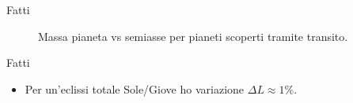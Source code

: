 \begin{frame}{Fatti}
\begin{figure}[!ht]
\centering
\caption{Massa pianeta vs semiasse per pianeti scoperti tramite transito.}
\end{figure}
\end{frame}

\begin{wordonframe}{Fatti}
\begin{itemize}
    \item Per un'eclissi totale Sole/Giove ho variazione $\Delta L\approx1\%$.
\end{itemize}
\end{wordonframe}